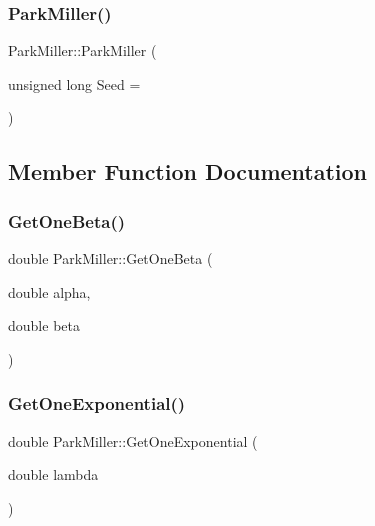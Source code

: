 \subsubsection{\texorpdfstring{Park\+Miller()}{ParkMiller()}}
{\footnotesize\ttfamily Park\+Miller\+::\+Park\+Miller (\begin{DoxyParamCaption}\item[{unsigned long}]{Seed = {} }\end{DoxyParamCaption})}



\subsection{Member Function Documentation}
\hypertarget{classParkMiller_a76e1a3f096128dbd63208dd1a7880279}{}\label{classParkMiller_a76e1a3f096128dbd63208dd1a7880279} 
\subsubsection{\texorpdfstring{Get\+One\+Beta()}{GetOneBeta()}}
{\footnotesize\ttfamily double Park\+Miller\+::\+Get\+One\+Beta (\begin{DoxyParamCaption}\item[{double}]{alpha,  }\item[{double}]{beta }\end{DoxyParamCaption})}

\hypertarget{classParkMiller_a0dab2b782320012c1e339f4848cb32c7}{}\label{classParkMiller_a0dab2b782320012c1e339f4848cb32c7} 
\subsubsection{\texorpdfstring{Get\+One\+Exponential()}{GetOneExponential()}}
{\footnotesize\ttfamily double Park\+Miller\+::\+Get\+One\+Exponential (\begin{DoxyParamCaption}\item[{double}]{lambda }\end{DoxyParamCaption})}

\hypertarget{classParkMiller_a7b1adfa2d2ea88542842a00281c70e94}{}\label{classParkMiller_a7b1adfa2d2ea88542842a00281c70e94} 

